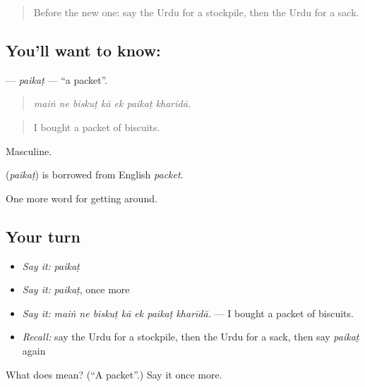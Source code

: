 \label{lesson:UR-C424-paikat}



\begin{quote}
Before the new one: say the Urdu for a stockpile, then the Urdu for a sack.
\end{quote}

\subsection*{You'll want to know: }
\textbf{} — \emph{paikaṭ} — \textquotedblleft{}a packet\textquotedblright{}.

\begin{quote}
      
\end{quote}

\begin{quote}
\emph{maiṅ ne biskuṭ kā ek paikaṭ kharīdā.}
\end{quote}

\begin{quote}
I bought a packet of biscuits.
\end{quote}

Masculine.

\begin{cousinweb}
\textbf{} (\emph{paikaṭ}) is borrowed from English \emph{packet}.
\end{cousinweb}

\begin{grammarlens}[title={What you've built}]
One more word for getting around.
\end{grammarlens}

\subsection*{Your turn}
\begin{itemize}
\raggedright
  \item \emph{Say it:} \emph{paikaṭ}
  \item \emph{Say it:} \emph{paikaṭ}, once more
  \item \emph{Say it:} \emph{maiṅ ne biskuṭ kā ek paikaṭ kharīdā.} — I bought a packet of biscuits.
  \item \emph{Recall:} say the Urdu for a stockpile, then the Urdu for a sack, then say \emph{paikaṭ} again
\end{itemize}

\begin{tcolorbox}[breakable,colback=teal!4,colframe=teal!35!black,title={Before you move on}]
What does  mean? (\textquotedblleft{}A packet\textquotedblright{}.) Say it once more.
\end{tcolorbox}
